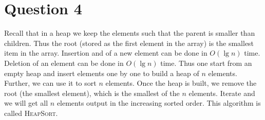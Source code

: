 \documentclass[11pt]{article}
\begin{document}
\clearpage
\section{Question 4} Recall that in a heap we keep the elements such that the parent is smaller than children. Thus the root (stored as the first element in the array) is the smallest item in the array. Insertion and of a new element can be done in $O(\lg n)$ time. Deletion of an element can be done in $O(\lg n)$ time. Thus one start from an empty heap and insert elements one by one to build a heap of $n$ elements. Further, we can use it to sort $n$ elements. Once the heap is built, we remove the root (the smallest element), which is the smallest of the $n$ elements. Iterate and we will get all $n$ elements output in the increasing sorted order.  This algorithm is called  \textsc{HeapSort}.
 
\end{document}
